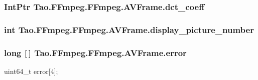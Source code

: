 \hypertarget{struct_tao_1_1_f_fmpeg_1_1_f_fmpeg_1_1_a_v_frame_a3bef657aaf7a6fb84de9546353c75e86}{
\subsubsection[{dct\_\-coeff}]{\setlength{\rightskip}{0pt plus 5cm}IntPtr {\bf Tao.FFmpeg.FFmpeg.AVFrame.dct\_\-coeff}}}
\label{struct_tao_1_1_f_fmpeg_1_1_f_fmpeg_1_1_a_v_frame_a3bef657aaf7a6fb84de9546353c75e86}
\hypertarget{struct_tao_1_1_f_fmpeg_1_1_f_fmpeg_1_1_a_v_frame_a6a74cbe724a8d8e713758e43b1b9d74c}{
\subsubsection[{display\_\-picture\_\-number}]{\setlength{\rightskip}{0pt plus 5cm}int {\bf Tao.FFmpeg.FFmpeg.AVFrame.display\_\-picture\_\-number}}}
\label{struct_tao_1_1_f_fmpeg_1_1_f_fmpeg_1_1_a_v_frame_a6a74cbe724a8d8e713758e43b1b9d74c}
\hypertarget{struct_tao_1_1_f_fmpeg_1_1_f_fmpeg_1_1_a_v_frame_af9a97623ff7e2446c8cc815c61a27fa1}{
\subsubsection[{error}]{\setlength{\rightskip}{0pt plus 5cm}long \mbox{[}$\,$\mbox{]} {\bf Tao.FFmpeg.FFmpeg.AVFrame.error}}}
\label{struct_tao_1_1_f_fmpeg_1_1_f_fmpeg_1_1_a_v_frame_af9a97623ff7e2446c8cc815c61a27fa1}


uint64\_\-t error\mbox{[}4\mbox{]}; 

